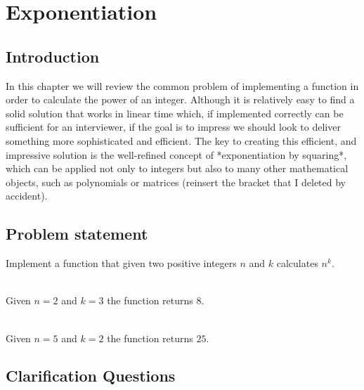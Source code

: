 %

\chapter{Exponentiation}
\label{ch:exponentiation}
\section*{Introduction}
In this chapter we will review the common problem of implementing a function in order to calculate the power of an integer.  
Although it is relatively easy to find a solid solution that works in linear time which, if implemented correctly can be sufficient for an interviewer, if the goal is to impress we should look to deliver something more sophisticated and efficient.
The key to creating this efficient, and impressive solution is the well-refined concept of *exponentiation by squaring*, which can be
applied not only to integers but also to many other mathematical objects, such as polynomials or matrices (reinsert the bracket that I deleted by accident).

\section{Problem statement}

\begin{exercise}
Implement a function that given two positive integers $n$ and $k$ calculates $n^k$.

    \begin{example}
        \hfill \\
        Given $n=2$ and $k=3$ the function returns $8$.
    \end{example}

    \begin{example}
        \hfill \\
        Given $n=5$ and $k=2$ the function returns $25$.
    \end{example}

\end{exercise}

\section{Clarification Questions}

